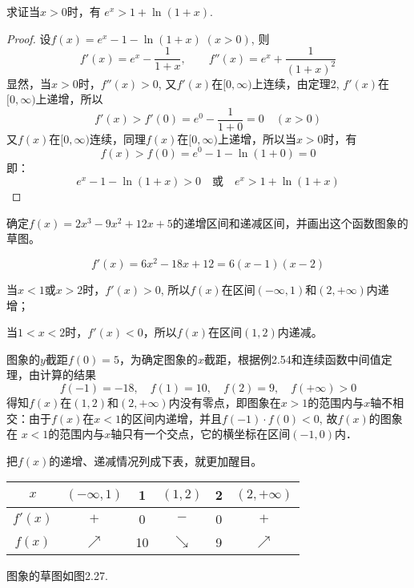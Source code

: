 \begin{example}
        求证当$x>0$时，有
$e^x> 1+\ln (1+x) $.
\end{example}


\begin{proof}
设$f(x)=e^x-1-\ln(1+x)\; (x>0)$, 则
\[f' (x) =e^x-\frac{1}{1+x},\qquad 
f''(x) =e^x +\frac{1}{(1+x)^2}\] 
    显然，当$x>0$时，$f''(x)>0$, 又$f'(x)$在$[0,\infty)$上连续，由定理2, $f'(x)$在$[0,\infty)$上递增，所以
\[f' (x) > f' (0) =e^0-\frac{1}{1+0}=0\quad  (x> 0) \]
又$f(x)$在$[0, \infty)$连续，同理$f(x)$在$[0, \infty)$上递增，所以当$x>0$时，有
\[f (x) > f (0) =e^0-1-\ln (1+0) =0\]
即：
\[e^x-1-\ln(1+x)>0\quad \text{或}\quad e^x>1+\ln(1+x)\]
\end{proof}


\begin{example}
    确定$f(x)=2x^3-9x^2+12x+5$的递增区间和递减区间，并画出这个函数图象的草图。
\end{example}


\begin{solution}
  \[  f'(x)=6x^2-18x+12=6(x-1)(x-2)\]

  当$x<1$或$x>2$时，$f'(x)>0$, 所以$f(x)$在区间$(-\infty,1)$和$(2,+\infty)$内递增；

  当$1<x<2$时，$f'(x)<0$，所以$f(x)$在区间$(1,2)$内递减。
  
  图象的$y$截距$f(0)=5$，为确定图象的$x$截距，根据例2.54和连续函数中间值定理，由计算的结果
  \[f(-1)=-18,\quad f(1)=10,\quad f(2)=9,\quad f(+\infty)>0\]
  得知$f(x)$在$(1, 2)$和$(2,+\infty)$内没有零点，即图象在$x>1$的范围内与$x$轴不相交：由于$f(x)$在$x<1$的区间内递增，并且$f(-1)\cdot f(0)<0$, 故$f(x)$的图象在
  $x<1$的范围内与$x$轴只有一个交点，它的横坐标在区间$(-1,0)$内．

  把$f(x)$的递增、递减情况列成下表，就更加醒目。

  \begin{center}
\begin{tabular}{c|ccccc}
\hline
$x$ & $(-\infty,1)$& 1& $(1,2)$ & 2& $(2,+\infty)$\\
\hline
$f'(x)$ & $+$ &0&$-$&0&$+$\\
$f(x)$ & $\nearrow$ &10&$\searrow$ &9&$\nearrow$ \\
\hline
\end{tabular}
  \end{center}
图象的草图如图2.27.

\begin{figure}[htp]
    \centering
{}
    \caption{}
\end{figure}
\end{solution}

